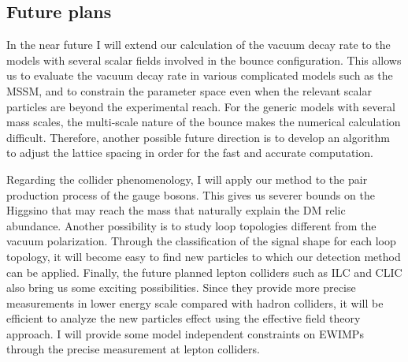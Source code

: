 \documentclass[12pt,notitlepage]{book}
\def\rem#1{ {\bf\textcolor{red}{($\clubsuit$ #1 $\clubsuit$)}}}
\begin{document}




\vspace*{-2mm}
\subsection*{Future plans}

In the near future I will extend our calculation of the vacuum decay
rate to the models with several scalar fields involved in the bounce
configuration.  This allows us to evaluate the vacuum decay rate in
various complicated models such as the MSSM, and to constrain the
parameter space even when the relevant scalar particles are beyond the
experimental reach.  For the generic models with several mass scales,
the multi-scale nature of the bounce makes the numerical calculation
difficult.  Therefore, another possible future direction is to develop
an algorithm to adjust the lattice spacing in order for the fast and
accurate computation.

Regarding the collider phenomenology, I will apply our method to the
pair production process of the gauge bosons.  This gives us severer
bounds on the Higgsino that may reach the mass that naturally explain
the DM relic abundance.  Another possibility is to study loop topologies
different from the vacuum polarization.  Through the classification of
the signal shape for each loop topology, it will become easy to find new
particles to which our detection method can be applied.  Finally, the
future planned lepton colliders such as ILC and CLIC also bring us some
exciting possibilities.  Since they provide more precise measurements in
lower energy scale compared with hadron colliders, it will be efficient
to analyze the new particles effect using the effective field theory
approach.  I will provide some model independent constraints on EWIMPs
through the precise measurement at lepton colliders.
\end{document}
